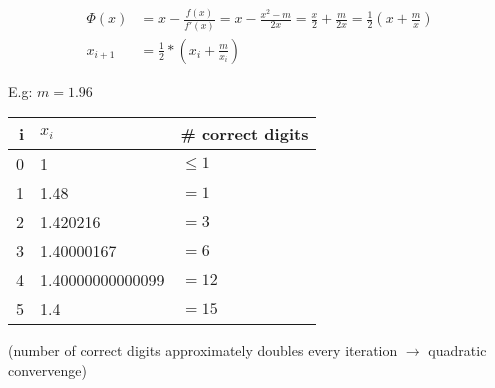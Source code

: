 \begin{align*}
    \Phi(x)&=x- \frac{f(x)}{f'(x)}= x- \frac{x^2-m}{2x}= \frac{x}{2}+ \frac{m}{2x} = \frac{1}{2} \left( x+ \frac{m}{x} \right)\\
    x_{i+1} &= \frac{1}{2}*\left(x_i+\frac{m}{x_i} \right)
\end{align*}

E.g: $m=1.96$
\begin{center}
    \begin{tabular}{r l l}
        \toprule
        i & $x_i$              & \# correct digits \\
        \midrule
        0 & 1                & $\leq 1$          \\
        1 & 1.48             & $=1$              \\
        2 & 1.420216         & $=3$              \\
        3 & 1.40000167       & $=6$              \\
        4 & 1.40000000000099 & $=12$             \\
        5 & 1.4              & $=15$             \\
        \bottomrule
    \end{tabular}
\end{center}
(number of correct digits approximately doubles every iteration $\to$ quadratic convervenge)
